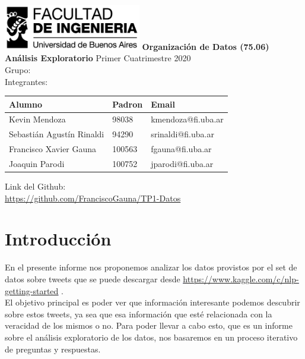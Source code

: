 \documentclass[titlepage,a4paper]{article}
\begin{document}
\begin{titlepage} %
  \hfill\includegraphics[width=6cm]{logofiuba.jpg}
    \centering
    \vfill
    \Huge \textbf{Organización de Datos (75.06)}
    \vskip1cm
    \Huge \textbf{Análisis Exploratorio}
    \vskip2cm
    \Large Primer Cuatrimestre 2020\\
    Grupo: \\
    Integrantes:\\
    \vfill
    \begin{tabular}{ | l | l | l | } 
      \hline
      Alumno & Padron & Email \\ \hline
      Kevin Mendoza & 98038 & kmendoza@fi.uba.ar \\ \hline
      Sebastián Agustín Rinaldi & 94290 & srinaldi@fi.uba.ar \\ \hline
      Francisco Xavier Gauna & 100563 & fgauna@fi.uba.ar \\ \hline
      Joaquin Parodi & 100752 & jparodi@fi.uba.ar \\ \hline
    \end{tabular}
    \vfill
    \vfill
    Link del Github:\\\textcolor{black}{\underline{\url{https://github.com/FranciscoGauna/TP1-Datos}}}
\end{titlepage}
\tableofcontents %
\newpage


\section{\Large Introducción}
{\Large 
En el presente informe nos proponemos analizar los datos provistos por el set de datos sobre tweets que se puede descargar desde \textcolor{blue}{\underline{\url{https://www.kaggle.com/c/nlp-getting-started}}} .\\
El objetivo principal es poder ver que información interesante podemos descubrir sobre estos tweets, ya sea que esa información que esté relacionada con la veracidad de los mismos o no. Para poder llevar a cabo esto, que es un informe sobre el análisis exploratorio de los datos, nos basaremos en un proceso iterativo de preguntas y respuestas.
\par}
\end{document}
